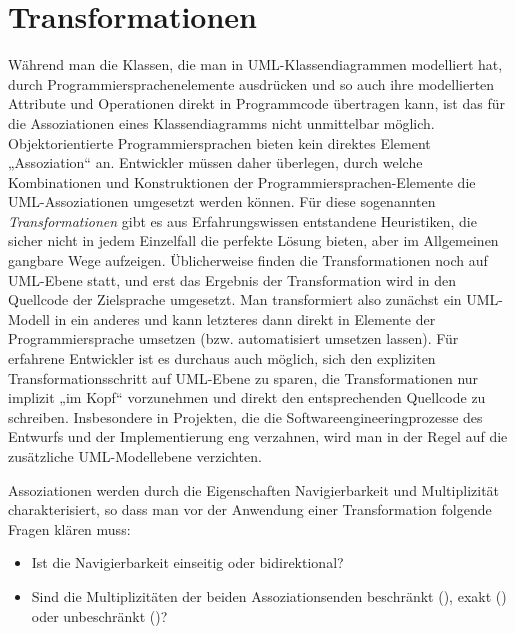 \section{Transformationen}
\label{sec:Kap-9.3}

\vspace{2mm} %

Während man die Klassen, die man in UML-Klassendiagrammen modelliert hat, durch Programmiersprachenelemente ausdrücken und so auch ihre modellierten Attri\-bute und Operationen direkt in Programmcode übertragen kann, ist das für die Assoziationen eines Klassendiagramms nicht unmittelbar möglich. Objektorien\-tierte Programmiersprachen bieten kein direktes Element „Assoziation“ an. Entwickler müssen daher überlegen, durch welche Kombinationen und Konstruktionen der Programmier\-sprachen-Elemente die UML-Assoziationen umgesetzt werden können. Für diese sogenannten \textit{Transformationen} gibt es aus Erfahrungswissen entstandene Heuristiken, die sicher nicht in jedem Einzelfall die perfekte Lösung bieten, aber im Allgemeinen gangbare Wege aufzeigen. Üblicherweise finden die Transformationen noch auf UML-Ebene statt, und erst das Ergebnis der Transformation wird in den Quellcode der Zielsprache umgesetzt. Man transformiert also zunächst ein UML-Modell in ein anderes und kann letzteres dann direkt in Elemente der Programmier\-sprache umsetzen (bzw. automatisiert umsetzen lassen). Für erfahrene Entwickler ist es durchaus auch möglich, sich den expliziten Transformationsschritt auf UML-Ebene zu sparen, die Transformationen nur implizit „im Kopf“ vorzunehmen und direkt den entsprechenden Quellcode zu schreiben. Insbesondere in Projekten, die die Software\-engineering\-prozesse des Entwurfs und der Implementierung eng verzahnen, wird man in der Regel auf die zusätzliche UML-Modellebene verzichten.

\vspace{2mm} %

Assoziationen werden durch die Eigenschaften Navigierbarkeit und Multiplizität charakterisiert, so dass man vor der Anwendung einer Transformation folgende Fragen klären muss:

\vspace{2mm} %

\begin{itemize}
	\item Ist die Navigierbarkeit einseitig oder bidirektional?
	\vspace{2mm} %
	\item Sind die Multiplizitäten der beiden Assoziationsenden beschränkt (\zb {}), exakt (\zb {}) oder unbeschränkt (\sttpUMLText{*})?
\end{itemize}

